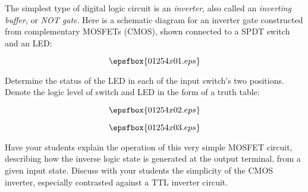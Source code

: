 

The simplest type of digital logic circuit is an {\it inverter}, also called an {\it inverting buffer}, or {\it NOT gate}.  Here is a schematic diagram for an inverter gate constructed from complementary MOSFETs (CMOS), shown connected to a SPDT switch and an LED:

$$\epsfbox{01254x01.eps}$$

Determine the status of the LED in each of the input switch's two positions.  Denote the logic level of switch and LED in the form of a truth table:

$$\epsfbox{01254x02.eps}$$







$$\epsfbox{01254x03.eps}$$







Have your students explain the operation of this very simple MOSFET circuit, describing how the inverse logic state is generated at the output terminal, from a given input state.  Discuss with your students the simplicity of the CMOS inverter, especially contrasted against a TTL inverter circuit.




